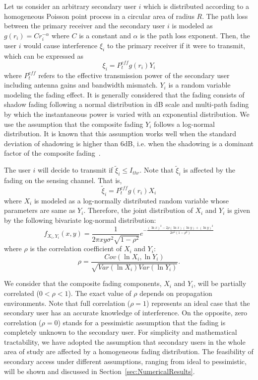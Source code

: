 \documentclass[12pt,submission,journal,onecolumn]{IEEEtran}
\begin{document}
Let us consider an arbitrary secondary user $i$ which is distributed according to a homogeneous Poisson point process in a circular area of radius $R$. The path loss between the primary receiver and the secondary user $i$ is modeled as $g(r_{i})=Cr_{i}^{-\alpha}$ where $C$ is a constant and $\alpha$ is the path loss exponent. Then, the user $i$ would cause interference $\xi_{i}$ to the primary receiver if it were to transmit, which can be expressed as
\begin{equation}
\label{eq:RealInter}
\xi_{i}=P_{t}^{eff} g(r_{i}) Y_{i}
\end{equation}
where $P_{t}^{eff}$ refers to the effective transmission power of the secondary user including antenna gains and bandwidth mismatch. $Y_{i}$ is a random variable modeling the fading effect. It is generally considered that the fading consists of shadow fading following a normal distribution in dB scale and multi-path fading by which the instantaneous power is varied with an exponential distribution. We use the assumption that the composite fading $Y_{i}$ follows a log-normal distribution. It is known that this assumption works well when the standard deviation of shadowing is higher than 6dB, i.e. when the shadowing is a dominant factor of the composite fading~\cite{507537}.

The user $i$ will decide to transmit if $\tilde{\xi}_{i}\leq I_{thr}$. Note that $\tilde{\xi}_{i}$ is affected by the fading on the sensing channel. That is,
\begin{equation}
\label{eq:BelievedInter}
\tilde{\xi}_{i} = P_{t}^{eff} g(r_{i}) X_{i}
\end{equation}
where $X_{i}$ is modeled as a log-normally distributed random variable whose parameters are same as $Y_{i}$. Therefore, the joint distribution of $X_{i}$ and $Y_{i}$ is given by the following bivariate log-normal distribution:
\begin{equation}
\label{eq:bivariatelog}
f_{X_{i},Y_{i}}(x,y) = \frac{1}{2 \pi xy  \sigma^2 \sqrt{1-\rho^2} } e^{-\frac{(\ln x)^2-2\rho(\ln x)(\ln y)+ (\ln y)^2}{2 \sigma^2 (1-\rho^2)}}
\end{equation}
where $\rho$ is the correlation coefficient of $X_{i}$ and $Y_{i}$:
\begin{equation}
\label{eq:correlation}
\rho = \frac{Cov(\ln X_{i},\ln Y_{i})}{\sqrt{Var(\ln X_{i})Var(\ln Y_{i})}}.
\end{equation}

We consider that the composite fading components, $X_{i}$ and $Y_{i}$, will be partially correlated ($ 0 < \rho < 1$). The exact value of $\rho$ depends on propagation environments. Note that full correlation ($\rho = 1$) represents an ideal case that the secondary user has an accurate knowledge of interference. On the opposite, zero correlation ($\rho = 0$) stands for a pessimistic assumption that the fading is completely unknown to the secondary user. For simplicity and mathematical tractability, we have adopted the assumption that secondary users in the whole area of study are affected by a homogeneous fading distribution. The feasibility of secondary access under different assumptions, ranging from ideal to pessimistic, will be shown and discussed in Section~\ref{sec:NumericalResults}.
\end{document}
